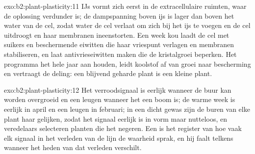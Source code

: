 \begin{solution}{exo:b2:plant-plasticity:11}
IJs vormt zich eerst in de extracellulaire ruimten, waar de oplossing
verdunder is; de dampspanning boven ijs is lager dan boven het water van de
cel, zodat water de cel verlaat om zich bij het ijs te voegen en de cel
uitdroogt en haar membranen ineenstorten. Een week kou laadt de cel met
suikers en beschermende eiwitten die haar vriespunt verlagen en membranen
stabiliseren, en laat antivrieseiwitten maken die de kristalgroei beperken.
Het programma het hele jaar aan houden, leidt koolstof af van groei naar
bescherming en vertraagt de deling: een blijvend geharde plant is een kleine
plant.
\end{solution}

\begin{solution}{exo:b2:plant-plasticity:12}
Het verroodsignaal is eerlijk wanneer de buur kan worden overgroeid en een
leugen wanneer het een boom is; de warme week is eerlijk in april en een
leugen in februari; in een dicht gewas zijn de buren van elke plant haar
gelijken, zodat het signaal eerlijk is in vorm maar nutteloos, en veredelaars
selecteren planten die het negeren. Een  is het register van hoe
vaak elk signaal in het verleden van de lijn de waarheid sprak, en hij faalt
telkens wanneer het heden van dat verleden verschilt.
\end{solution}

